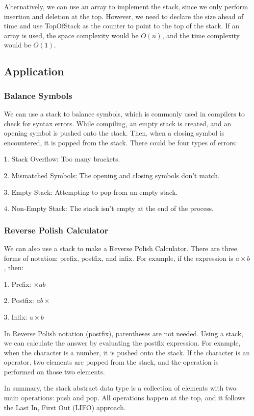Alternatively, we can use an array to implement the stack, since we only perform insertion and deletion at the top. However, we need to declare the size ahead of time and use TopOfStack as the counter to point to the top of the stack. If an array is used, the space complexity would be \(O(n)\), and the time complexity would be \(O(1)\). 

\subsection{Application}
\subsubsection{Balance Symbols}
We can use a stack to balance symbols, which is commonly used in compilers to check for syntax errors. While compiling, an empty stack is created, and an opening symbol is pushed onto the stack. Then, when a closing symbol is encountered, it is popped from the stack. There could be four types of errors:

1. Stack Overflow: Too many brackets.

2. Mismatched Symbols: The opening and closing symbols don't match.

3. Empty Stack: Attempting to pop from an empty stack.

4. Non-Empty Stack: The stack isn't empty at the end of the process.

\subsubsection{Reverse Polish Calculator}
We can also use a stack to make a Reverse Polish Calculator. There are three forms of notation: prefix, postfix, and infix. For example, if the expression is \(a \times b\), then:

1. Prefix: \(\times a b\)

2. Postfix: \(a b \times\)

3. Infix: \(a \times b\)

In Reverse Polish notation (postfix), parentheses are not needed. Using a stack, we can calculate the answer by evaluating the postfix expression. For example, when the character is a number, it is pushed onto the stack. If the character is an operator, two elements are popped from the stack, and the operation is performed on those two elements.

In summary, the stack abstract data type is a collection of elements with two main operations: push and pop. All operations happen at the top, and it follows the Last In, First Out (LIFO) approach.

